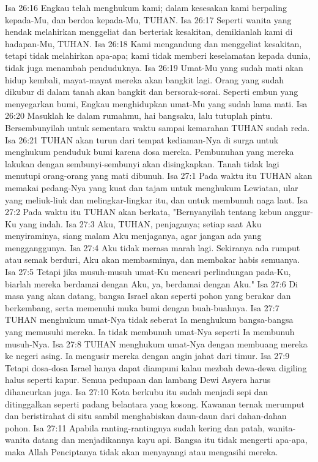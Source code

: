 Isa 26:16  Engkau telah menghukum kami; dalam kesesakan kami berpaling kepada-Mu, dan berdoa kepada-Mu, TUHAN.
Isa 26:17  Seperti wanita yang hendak melahirkan menggeliat dan berteriak kesakitan, demikianlah kami di hadapan-Mu, TUHAN.
Isa 26:18  Kami mengandung dan menggeliat kesakitan, tetapi tidak melahirkan apa-apa; kami tidak memberi keselamatan kepada dunia, tidak juga menambah penduduknya.
Isa 26:19  Umat-Mu yang sudah mati akan hidup kembali, mayat-mayat mereka akan bangkit lagi. Orang yang sudah dikubur di dalam tanah akan bangkit dan bersorak-sorai. Seperti embun yang menyegarkan bumi, Engkau menghidupkan umat-Mu yang sudah lama mati.
Isa 26:20  Masuklah ke dalam rumahmu, hai bangsaku, lalu tutuplah pintu. Bersembunyilah untuk sementara waktu sampai kemarahan TUHAN sudah reda.
Isa 26:21  TUHAN akan turun dari tempat kediaman-Nya di surga untuk menghukum penduduk bumi karena dosa mereka. Pembunuhan yang mereka lakukan dengan sembunyi-sembunyi akan disingkapkan. Tanah tidak lagi menutupi orang-orang yang mati dibunuh.
Isa 27:1  Pada waktu itu TUHAN akan memakai pedang-Nya yang kuat dan tajam untuk menghukum Lewiatan, ular yang meliuk-liuk dan melingkar-lingkar itu, dan untuk membunuh naga laut.
Isa 27:2  Pada waktu itu TUHAN akan berkata, "Bernyanyilah tentang kebun anggur-Ku yang indah.
Isa 27:3  Aku, TUHAN, penjaganya; setiap saat Aku menyiraminya, siang malam Aku menjaganya, agar jangan ada yang mengganggunya.
Isa 27:4  Aku tidak merasa marah lagi. Sekiranya ada rumput atau semak berduri, Aku akan membasminya, dan membakar habis semuanya.
Isa 27:5  Tetapi jika musuh-musuh umat-Ku mencari perlindungan pada-Ku, biarlah mereka berdamai dengan Aku, ya, berdamai dengan Aku."
Isa 27:6  Di masa yang akan datang, bangsa Israel akan seperti pohon yang berakar dan berkembang, serta memenuhi muka bumi dengan buah-buahnya.
Isa 27:7  TUHAN menghukum umat-Nya tidak seberat Ia menghukum bangsa-bangsa yang memusuhi mereka. Ia tidak membunuh umat-Nya seperti Ia membunuh musuh-Nya.
Isa 27:8  TUHAN menghukum umat-Nya dengan membuang mereka ke negeri asing. Ia mengusir mereka dengan angin jahat dari timur.
Isa 27:9  Tetapi dosa-dosa Israel hanya dapat diampuni kalau mezbah dewa-dewa digiling halus seperti kapur. Semua pedupaan dan lambang Dewi Asyera harus dihancurkan juga.
Isa 27:10  Kota berkubu itu sudah menjadi sepi dan ditinggalkan seperti padang belantara yang kosong. Kawanan ternak merumput dan beristirahat di situ sambil menghabiskan daun-daun dari dahan-dahan pohon.
Isa 27:11  Apabila ranting-rantingnya sudah kering dan patah, wanita-wanita datang dan menjadikannya kayu api. Bangsa itu tidak mengerti apa-apa, maka Allah Penciptanya tidak akan menyayangi atau mengasihi mereka.
